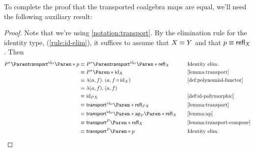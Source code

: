 \documentclass[12pt,twoside,draft]{reedthesis}
\begin{document}
To complete the proof that the transported coalgebra maps are equal, we'll need
the following auxiliary result:

\begin{proof}
  Note that we're using \cref{notation:transport}. By the elimination rule for
  the identity type, (\cref{rule:id-elim}), it suffices to assume that $X\equiv
  Y$ and that $p\equiv\mathsf{refl}_{X}$. Then
  \begin{align*}
    P^*\paren*{\transpor{\id_{\universe}}{p}}
    &\jdeq P^*\paren*{\transpor{\id_{\universe}}{\refl{X}}}
    &&\quad\text{Identity elim.} \\
    &\jdeq P^*\paren{\id_X}
    &&\quad\text{\Cref{lemma:transport}} \\
    &\jdeq \lam{(a,f)}{(a,f\circ \id_X)}
    &&\quad\text{\Cref{def:polynomial-functor}} \\
    &\jdeq \lam{(a,f)}{(a,f)} \\
    &\jdeq \id_{PX}
    &&\quad\text{\Cref{def:id-polymorphic}} \\
    &\jdeq \transpor{\id_{\universe}}{\refl{PX}}
    &&\quad\text{\Cref{lemma:transport}} \\
    &\jdeq \transpor{\id_{\universe}}{\ap{P}{\refl{X}}}
    &&\quad\text{\Cref{lemma:ap}} \\
    &\jdeq \transpor{P}{\refl{X}}
    &&\quad\text{\Cref{lemma:transport-compose}} \\
    &\jdeq \transpor{P}{p}
    &&\quad\text{Identity elim.}
  \end{align*}
\end{proof}
\end{document}
